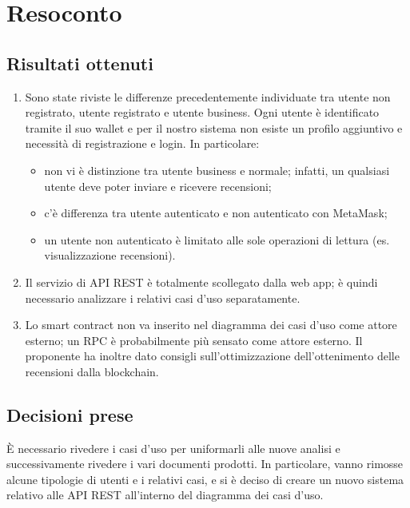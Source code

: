 \section{Resoconto}

\subsection{Risultati ottenuti}

\begin{enumerate}
    \item Sono state riviste le differenze precedentemente individuate tra utente non
          registrato, utente registrato e utente business. Ogni utente è identificato
          tramite il suo wallet e per il nostro sistema non esiste un profilo aggiuntivo
          e necessità di registrazione e login. In particolare:
          \begin{itemize}
              \item non vi è distinzione tra utente business e normale; infatti, un qualsiasi
                    utente deve poter inviare e ricevere recensioni;
              \item c'è differenza tra utente autenticato e non autenticato con MetaMask;
              \item un utente non autenticato è limitato alle sole operazioni di lettura (es.
                    visualizzazione recensioni).
          \end{itemize}
    \item Il servizio di API REST è totalmente scollegato dalla web app; è quindi
          necessario analizzare i relativi casi d'uso separatamente.
    \item Lo smart contract non va inserito nel diagramma dei casi d'uso come attore
          esterno; un RPC è probabilmente più sensato come attore esterno. Il proponente
          ha inoltre dato consigli sull'ottimizzazione dell'ottenimento delle recensioni
          dalla blockchain.
\end{enumerate}

\subsection{Decisioni prese}
È necessario rivedere i casi d'uso per uniformarli alle nuove analisi e successivamente rivedere i vari documenti prodotti. In particolare, vanno rimosse alcune tipologie di utenti e i relativi casi, e si è deciso di creare un nuovo sistema relativo alle API REST all'interno del diagramma dei casi d'uso.